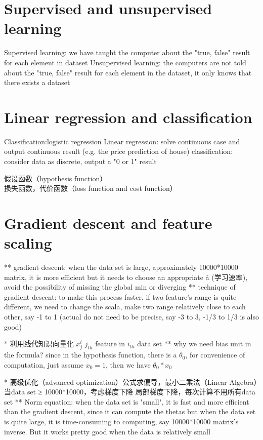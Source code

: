 \documentclass[10pt]{article}
\begin{document}
\section{Supervised and unsupervised learning}
Supervised learning: we have taught the computer about the "true, false" result for each element in dataset Unsupervised learning: 
the computers are not told about the "true, false" result for each element in the dataset, it only knows that there exists a dataset


\section{Linear regression and classification}
Classification:logistic regression
Linear regression: solve continuous case and output continuous result (e.g. the price prediction of house) 
classification: consider data as discrete, output a "0 or 1" result

假设函数（hypothesis function）\\

损失函数，代价函数（loss function and cost function）\\

\section{Gradient descent and feature scaling}

** gradient descent: 
when the data set is large, approximately 10000*10000 matrix, it is more efficient
but it needs to choose an appropriate å (学习速率), avoid the possibility of missing the global min or diverging
** technique of gradient descent:
to make this process faster, if two feature's range is quite different, we need to change the scala, make two range relatively
close to each other, say -1 to 1 (actual do not need to be precise, say -3 to 3, -1/3 to 1/3 is also good)

* 利用线代知识向量化 $x^i_j$    $j_{th}$ feature in $i_{th}$ data set
** why we need bias unit in the formula? 
    since in the hypothesis function, there is a $\theta_0$, for convenience of computation, just assume $x_0 = 1$, then we have $\theta_0*x_0$

* 高级优化（advanced optimization）公式求偏导，最小二乘法（Linear Algebra）当data set ≥ 10000*10000，考虑梯度下降
  局部梯度下降，每次计算不用所有data set
** Norm equation:
when the data set is "small", it is fast and more efficient than the gradient descent, since it can compute the thetas
but when the data set is quite large, it is time-consuming to computing, say 10000*10000 matrix's inverse. But it works pretty 
good when the data is relatively small
\end{document}
